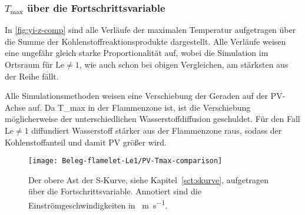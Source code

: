\subsubsection{\texorpdfstring{$T_\mathrm{max}$}{Tmax} über die Fortschrittsvariable}
\label{sct:cmp-Tmax-PV}

In \autoref{fig:yi-z-comp} sind alle Verläufe der maximalen Temperatur aufgetragen über die Summe der Kohlenstoffreaktionsprodukte dargestellt. Alle Verläufe weisen eine ungefähr gleich starke Proportionalität auf, wobei die Simulation im Ortsraum für $\mathrm{Le}\neq 1$, wie auch schon bei obigen Vergleichen, am stärksten aus der Reihe fällt.

Alle Simulationsmethoden weisen eine Verschiebung der Geraden auf der $\mathrm{PV}$-Achse auf. Da \gls{T_max} in der Flammenzone ist, ist die Verschiebung möglicherweise der unterschiedlichen Wasserstoffdiffusion geschuldet. Für den Fall $\mathrm{Le}\neq 1$ diffundiert Wasserstoff stärker aus der Flammenzone raus, sodass der Kohlenstoffanteil und damit $\mathrm{PV}$ größer wird.

\begin{figure}[H]
    \begin{center}\begin{minipage}{0.6\linewidth}
        \texttt{[image: Beleg-flamelet-Le1/PV-Tmax-comparison]}
    \end{minipage}\end{center}
    \caption{Der obere Ast der S-Kurve, siehe Kapitel~\ref{sct:skurve}, aufgetragen über die Fortschrittsvariable. Annotiert sind die Einströmgeschwindigkeiten in \SI{}{\meter\per\second}.}
    \label{fig:yi-z-comp}
\end{figure}


